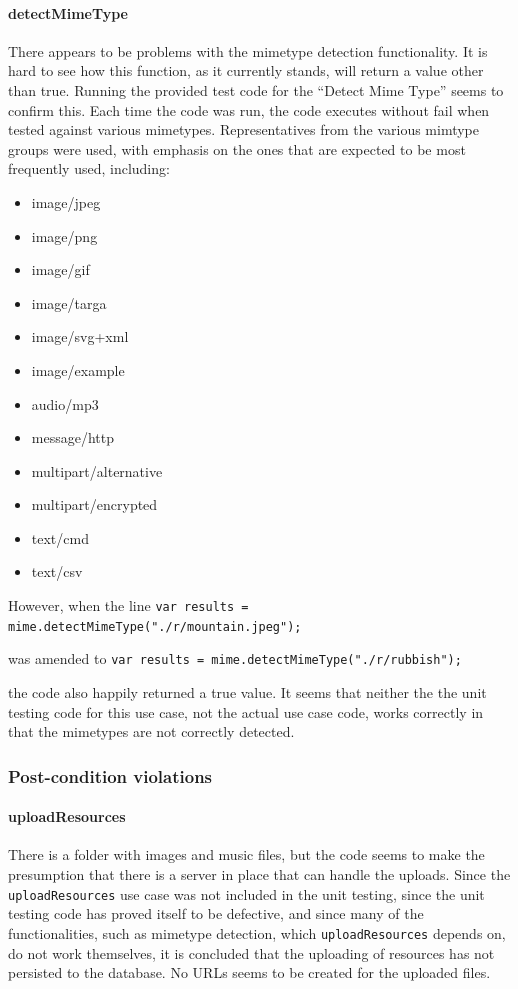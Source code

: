 \documentclass[a4paper]{article}
\begin{document}
\paragraph{detectMimeType} 
There appears to be problems with the mimetype detection functionality. It is hard to see how this function, as it currently stands, will return a value other than true. Running the provided test code for the “Detect Mime Type” seems to confirm this. Each time the code was run, the code executes without fail when tested against various mimetypes. Representatives from the various mimtype groups were used, with emphasis on the ones that are expected to be most frequently used, including:
\begin{itemize}
\item image/jpeg
\item image/png
\item image/gif
\item image/targa
\item image/svg+xml
\item image/example
\item audio/mp3
\item message/http
\item multipart/alternative
\item multipart/encrypted
\item text/cmd
\item text/csv
\end{itemize}
However, when the line \texttt{var results = mime.detectMimeType("./r/mountain.jpeg");} 

was amended to \texttt{var results = mime.detectMimeType("./r/rubbish");}

the code also happily returned a true value. It seems that neither the the unit testing code for this use case, not the actual use case code, works correctly in that the mimetypes are not correctly detected.

\subsubsection {Post-condition violations}

\paragraph{uploadResources}
There is a folder with images and music files, but the code seems to make the presumption that there is a server in place that can handle the uploads. Since the \texttt{uploadResources} use case was not included in the unit testing, since the unit testing code has proved itself to be defective, and since many of the functionalities, such as mimetype detection, which \texttt{uploadResources} depends on, do not work themselves, it is concluded that the uploading of resources has not persisted to the database. No URLs seems to be created for the uploaded files. 
\end{document}
